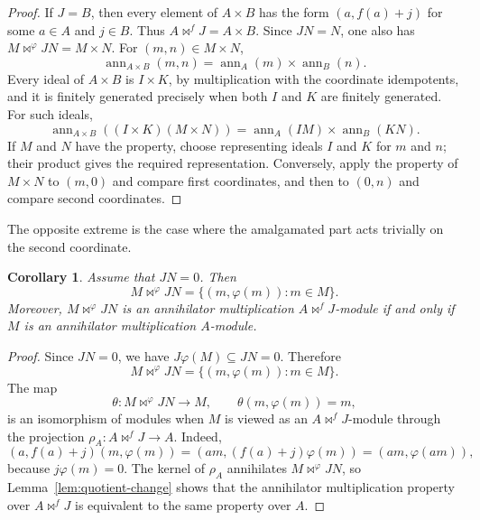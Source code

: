 \documentclass[11pt]{amsart}
\theoremstyle{plain}
\newtheorem{corollary}[theorem]{Corollary}
\theoremstyle{definition}
\theoremstyle{remark}
\newcommand{\ann}{\operatorname{ann}}
\numberwithin{equation}{section}
\begin{document}
\begin{proof}
If $J=B$, then every element of $A\times B$ has the form $(a,f(a)+j)$ for some
$a\in A$ and $j\in B$. Thus $A\bowtie^fJ=A\times B$. Since $JN=N$, one also
has $M\bowtie^\varphi JN=M\times N$. For $(m,n)\in M\times N$,
\[
\ann_{A\times B}(m,n)=\ann_A(m)\times\ann_B(n).
\]
Every ideal of $A\times B$ is $I\times K$, by multiplication with the
coordinate idempotents, and it is finitely generated precisely when both
$I$ and $K$ are finitely generated. For such ideals,
\[
\ann_{A\times B}((I\times K)(M\times N))=\ann_A(IM)\times\ann_B(KN).
\]
If $M$ and $N$ have the property, choose representing ideals $I$ and $K$
for $m$ and $n$; their product gives the required representation.
Conversely, apply the property of $M\times N$ to $(m,0)$ and compare first
coordinates, and then to $(0,n)$ and compare second coordinates.
\end{proof}

The opposite extreme is the case where the amalgamated part acts trivially on
the second coordinate.

\begin{corollary}
\label{cor:trivial-amalgamated-part}
Assume that $JN=0$. Then
\[
M\bowtie^\varphi JN=\{(m,\varphi(m)):m\in M\}.
\]
Moreover, $M\bowtie^\varphi JN$ is an annihilator multiplication
$A\bowtie^fJ$-module if and only if $M$ is an annihilator multiplication
$A$-module.
\end{corollary}

\begin{proof}
Since $JN=0$, we have $J\varphi(M)\subseteq JN=0$. Therefore
\[
M\bowtie^\varphi JN=\{(m,\varphi(m)):m\in M\}.
\]
The map
\[
\theta:M\bowtie^\varphi JN\longrightarrow M, \qquad \theta(m,\varphi(m))=m,
\]
is an isomorphism of modules when $M$ is viewed as an
$A\bowtie^fJ$-module through the projection
$\rho_A:A\bowtie^fJ\to A$. Indeed,
\[
(a,f(a)+j)(m,\varphi(m))=(am,(f(a)+j)\varphi(m))=(am,\varphi(am)),
\]
because $j\varphi(m)=0$. The kernel of $\rho_A$ annihilates
$M\bowtie^\varphi JN$, so Lemma~\ref{lem:quotient-change} shows that the
annihilator multiplication property over $A\bowtie^fJ$ is equivalent to the same
property over $A$.
\end{proof}
\end{document}
